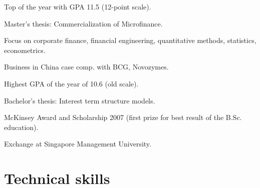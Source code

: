 \documentclass[a4paper]{janus-resume}
\begin{document}
\begin{minipage}[t]{0.49\textwidth}
Top of the year with GPA 11.5 (12-point scale).
\begin{tightitemize}
\item Master's thesis: Commercialization of Microfinance. \\
\item Focus on corporate finance, financial engineering, 
quantitative methods, statistics, econometrics.\\
\item Business in China case comp. with BCG, Novozymes. \\
\end{tightitemize}

\sectionspace %

Highest GPA of the year of 10.6 (old scale).
\begin{tightitemize}
\item Bachelor's thesis: Interest term structure models. \\
\item McKinsey Award and Scholarship 2007 (first prize for best result of the B.Sc. education). \\
\item Exchange at Singapore Management University. \\
\end{tightitemize}

\sectionspace %





\section{Technical skills}


\end{minipage}
\end{document}
